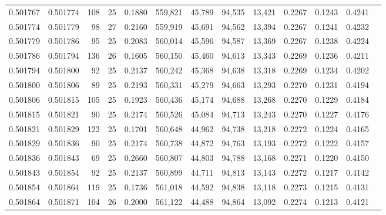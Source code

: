 \begin{tabular}{rrrrrrrrrrrrr}
0.501767 & 0.501774 & 108 &  25 &                                     0.1880 & 559,821 &  45,789 &  94,535 &  13,421 & 0.2267 & 0.1243 & 0.4241 \\
0.501774 & 0.501779 &  98 &  27 &                                     0.2160 & 559,919 &  45,691 &  94,562 &  13,394 & 0.2267 & 0.1241 & 0.4232 \\
0.501779 & 0.501786 &  95 &  25 &                                     0.2083 & 560,014 &  45,596 &  94,587 &  13,369 & 0.2267 & 0.1238 & 0.4224 \\
0.501786 & 0.501794 & 136 &  26 &                                     0.1605 & 560,150 &  45,460 &  94,613 &  13,343 & 0.2269 & 0.1236 & 0.4211 \\
0.501794 & 0.501800 &  92 &  25 &                                     0.2137 & 560,242 &  45,368 &  94,638 &  13,318 & 0.2269 & 0.1234 & 0.4202 \\
0.501800 & 0.501806 &  89 &  25 &                                     0.2193 & 560,331 &  45,279 &  94,663 &  13,293 & 0.2270 & 0.1231 & 0.4194 \\
0.501806 & 0.501815 & 105 &  25 &                                     0.1923 & 560,436 &  45,174 &  94,688 &  13,268 & 0.2270 & 0.1229 & 0.4184 \\
0.501815 & 0.501821 &  90 &  25 &                                     0.2174 & 560,526 &  45,084 &  94,713 &  13,243 & 0.2270 & 0.1227 & 0.4176 \\
0.501821 & 0.501829 & 122 &  25 &                                     0.1701 & 560,648 &  44,962 &  94,738 &  13,218 & 0.2272 & 0.1224 & 0.4165 \\
0.501829 & 0.501836 &  90 &  25 &                                     0.2174 & 560,738 &  44,872 &  94,763 &  13,193 & 0.2272 & 0.1222 & 0.4157 \\
0.501836 & 0.501843 &  69 &  25 &                                     0.2660 & 560,807 &  44,803 &  94,788 &  13,168 & 0.2271 & 0.1220 & 0.4150 \\
0.501843 & 0.501854 &  92 &  25 &                                     0.2137 & 560,899 &  44,711 &  94,813 &  13,143 & 0.2272 & 0.1217 & 0.4142 \\
0.501854 & 0.501864 & 119 &  25 &                                     0.1736 & 561,018 &  44,592 &  94,838 &  13,118 & 0.2273 & 0.1215 & 0.4131 \\
0.501864 & 0.501871 & 104 &  26 &                                     0.2000 & 561,122 &  44,488 &  94,864 &  13,092 & 0.2274 & 0.1213 & 0.4121 \\

\end{tabular}
